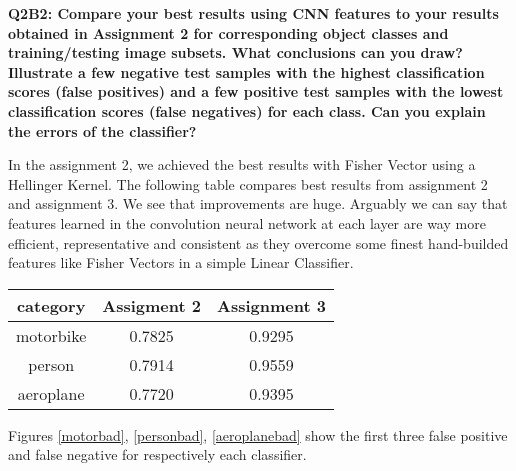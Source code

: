 \documentclass[a4paper,11pt]{exam}
\begin{document}
\textbf{Q2B2: Compare your best results using CNN features to your results obtained in Assignment 2 for corresponding object classes and training/testing image subsets. What conclusions can you draw? Illustrate a few negative test samples with the highest classification scores (false positives) and a few positive test samples with the lowest classification scores (false negatives) for each class. Can you explain the errors of the classifier?\\}

In the assignment 2, we achieved the best results with Fisher Vector using a Hellinger Kernel. The following table compares best results from assignment 2 and assignment 3. We see that improvements are huge. Arguably we can say that features learned in the convolution neural network at each layer are way more efficient, representative and consistent as they overcome some finest hand-builded features like Fisher Vectors in a simple Linear Classifier.

\begin{center}
\begin{tabular}{ c | c | c}
	category & Assigment 2 & Assignment 3 \\
	\hline
	   motorbike &  0.7825 & 0.9295 \\
	   person  & 0.7914  &  0.9559 \\
	   aeroplane &  0.7720  &  0.9395 \\
	 \hline
\end{tabular}
\end{center}

Figures \ref{motorbad}, \ref{personbad}, \ref{aeroplanebad} show the first three false positive and false negative for respectively each classifier.
\end{document}
